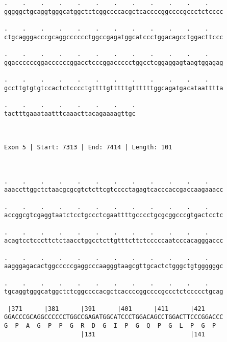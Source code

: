 \documentclass{article}
\begin{document}
\begin{Verbatim}
.    .    .    .    .    .    .    .    .    .    .    .    
gggggctgcaggtgggcatggctctcggccccacgctcaccccggccccgccctctcccc
                                                            
.    .    .    .    .    .    .    .    .    .    .    .    
ctgcagggacccgcaggcccccctggccgagatggcatccctggacagcctggacttccc
                                                            
.    .    .    .    .    .    .    .    .    .    .    .    
ggaccccccggaccccccggacctcccggaccccctggcctcggaggagtaagtggagag
                                                            
.    .    .    .    .    .    .    .    .    .    .    .    
gccttgtgtgtccactctcccctgttttgtttttgttttttggcagatgacataatttta
                                                            
.    .    .    .    .    .    .    .
tactttgaaataatttcaaacttacagaaaagttgc
                                    
                                    
 
Exon 5 | Start: 7313 | End: 7414 | Length: 101



.    .    .    .    .    .    .    .    .    .    .    .    
aaaccttggctctaacgcgcgtctcttcgtcccctagagtcacccaccgaccaagaaacc
                                                            
.    .    .    .    .    .    .    .    .    .    .    .    
accggcgtcgaggtaatctcctgccctcgaattttgcccctgcgcggcccgtgactcctc
                                                            
.    .    .    .    .    .    .    .    .    .    .    .    
acagtcctcccttctctaacctggcctcttgtttcttctcccccaatcccacagggaccc
                                                            
.    .    .    .    .    .    .    .    .    .    .    .    
aagggagacactggcccccgaggcccaagggtaagcgttgcactctgggctgtggggggc
                                                            
.    .    .    .    .    .    .    .    .    .    .    .    
tgcaggtgggcatggctctcggccccacgctcaccccggccccgccctctccccctgcag
                                                            
 |371      |381      |391      |401      |411      |421     
GGACCCGCAGGCCCCCCTGGCCGAGATGGCATCCCTGGACAGCCTGGACTTCCCGGACCC
G  P  A  G  P  P  G  R  D  G  I  P  G  Q  P  G  L  P  G  P  
                     |131                          |141     
  

\end{Verbatim}
\end{document}
